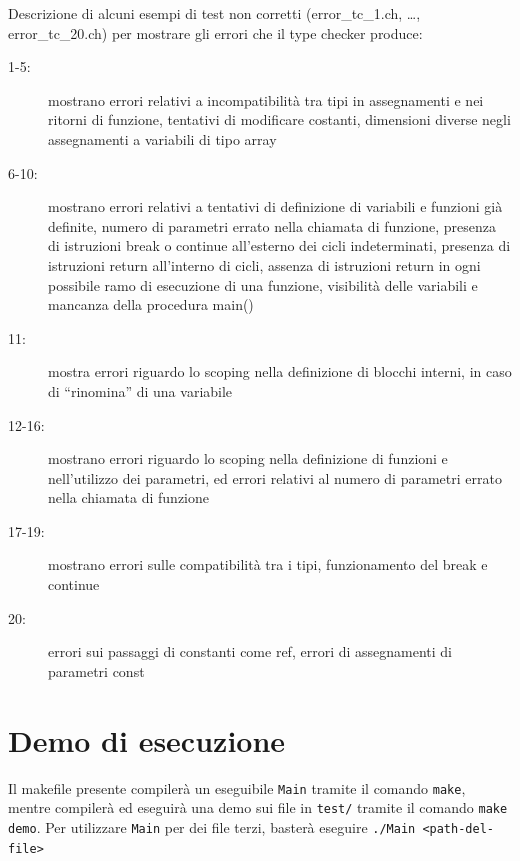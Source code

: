 \documentclass{report}
\newcommand{\term}[1]{\texttt{#1}}
\begin{document}
Descrizione di alcuni esempi di test non corretti (error\_tc\_1.ch, …, error\_tc\_20.ch) per mostrare 
gli errori che il type checker produce:
\begin{description}
    \item[1-5:] mostrano errori relativi a incompatibilità tra tipi in assegnamenti e nei ritorni di funzione,
        tentativi di modificare costanti, dimensioni diverse negli assegnamenti a variabili di tipo array
    
    \item[6-10:] mostrano errori relativi a tentativi di definizione di variabili e funzioni già definite,
        numero di parametri errato nella chiamata di funzione, presenza di istruzioni break o continue
        all'esterno dei cicli indeterminati, presenza di istruzioni return all'interno di cicli,
        assenza di istruzioni return in ogni possibile ramo di esecuzione di una funzione,
        visibilità delle variabili e mancanza della procedura main()

    \item[11:] mostra errori riguardo lo scoping nella definizione di blocchi interni, in caso di ``rinomina''
        di una variabile
    
    \item[12-16:] mostrano errori riguardo lo scoping nella definizione di funzioni e nell'utilizzo
        dei parametri, ed errori relativi al numero di parametri errato nella chiamata di funzione

    \item[17-19:] mostrano errori sulle compatibilità tra i tipi, funzionamento del break e continue

    \item[20:] errori sui passaggi di constanti come ref, errori di assegnamenti di parametri const

\end{description}


\section {Demo di esecuzione}

Il makefile presente compilerà un eseguibile \term{Main} tramite il comando \term{make}, mentre
compilerà ed eseguirà una demo sui file in \term{test/} tramite il comando \term{make demo}.
Per utilizzare \term{Main} per dei file terzi, basterà eseguire \term{./Main <path-del-file>}
\end{document}
